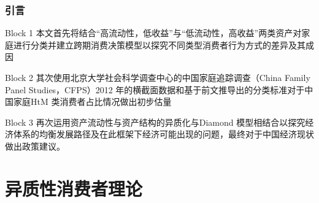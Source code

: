 \documentclass{beamer}
\begin{document}
\begin{frame}
\frametitle{引言}
\begin{block}{Block 1}
本文首先将结合“高流动性，低收益”与“低流动性，高收益”两类资产对家庭进行分类并建立跨期消费决策模型以探究不同类型消费者行为方式的差异及其成因
\end{block}

\begin{block}{Block 2}
其次使用北京大学社会科学调查中心的中国家庭追踪调查（China Family Panel Studies，CFPS）2012 年的横截面数据和基于前文推导出的分类标准对于中国家庭HtM 类消费者占比情况做出初步估量
\end{block}

\begin{block}{Block 3}
再次运用资产流动性与资产结构的异质化与Diamond 模型相结合以探究经济体系的均衡发展路径及在此框架下经济可能出现的问题，最终对于中国经济现状做出政策建议。
\end{block}
\end{frame}





\section{异质性消费者理论}

\end{document}
